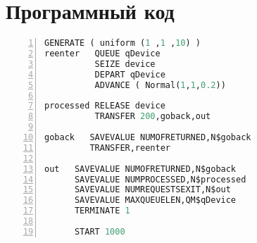 \chapter{Программный код}

\begin{lstlisting}[language=Python,
    frame= tb,
    numbers=left,
    numberstyle=\footnotesize]
GENERATE ( uniform (1 ,1 ,10) )
reenter   QUEUE qDevice
		  SEIZE device
		  DEPART qDevice
		  ADVANCE ( Normal(1,1,0.2))

processed RELEASE device
		  TRANSFER 200,goback,out

goback   SAVEVALUE NUMOFRETURNED,N$goback
		 TRANSFER,reenter

out   SAVEVALUE NUMOFRETURNED,N$goback
	  SAVEVALUE NUMPROCESSED,N$processed
	  SAVEVALUE NUMREQUESTSEXIT,N$out
	  SAVEVALUE MAXQUEUELEN,QM$qDevice
	  TERMINATE 1

	  START 1000
\end{lstlisting}